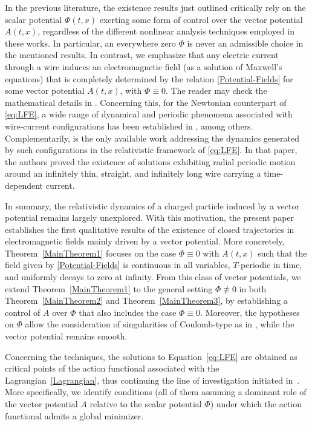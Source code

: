 \documentclass{article}
\theoremstyle{definition}
\begin{document}
In the previous literature, the existence results just outlined critically rely on the scalar potential $\Phi(t,x)$ exerting some form of control over the vector potential $A(t,x)$, regardless of the different nonlinear analysis techniques employed in these works. In particular, an everywhere zero $\Phi$ is never an admissible choice in the mentioned results. In contrast, we emphasize that any electric current through a wire induces an electromagnetic field (as a solution of Maxwell’s equations) that is completely determined by the relation \eqref{Potential-Fields} for some vector potential $A(t,x)$, with $\Phi\equiv0$. The reader may check the mathematical details in \cite{GM, Gri, Jac}. Concerning this, for the Newtonian counterpart of \eqref{eq:LFE}, a wide range of dynamical and periodic phenomena associated with wire-current configurations has been established in \cite{ALP, GM, GP1, GP2, VBB}, among others. Complementarily, \cite{GT2} is the only available work addressing the dynamics generated by such configurations in the relativistic framework of \eqref{eq:LFE}. In that paper, the authors proved the existence of solutions exhibiting radial periodic motion around an infinitely thin, straight, and infinitely long wire carrying a time-dependent current. 

In summary, the relativistic dynamics of a charged particle induced by a vector potential remains largely unexplored. With this motivation, the present paper establishes the first qualitative  results of the existence of closed trajectories in electromagnetic fields mainly driven by a vector potential. More concretely, Theorem~\ref{MainTheorem1} focuses on the case $\Phi\equiv0$ with $A(t,x)$ such that the field given by \eqref{Potential-Fields} is continuous in all variables, $T$-periodic in time, and uniformly decays to zero at infinity. From this class of vector potentials, we extend Theorem~\ref{MainTheorem1} to the general setting $\Phi\not\equiv0$ in both Theorem~\ref{MainTheorem2} and Theorem~\ref{MainTheorem3}, by establishing a control of $A$ over $\Phi$ that also includes the case $\Phi\equiv0$. Moreover, the hypotheses on $\Phi$ allow the consideration of singularities of Coulomb-type as in \cite{AS,Ber1}, while the vector potential remains smooth. 

Concerning the techniques, the solutions to Equation~\eqref{eq:LFE} are obtained as critical points of the action functional associated with the Lagrangian~\eqref{Lagrangian}, thus continuing the line of investigation initiated in~\cite{ABT}. More specifically, we identify conditions (all of them assuming a dominant role of the vector potential \( A \) relative to the scalar potential \( \Phi \)) under which the action functional admits a global minimizer. 
\end{document}

